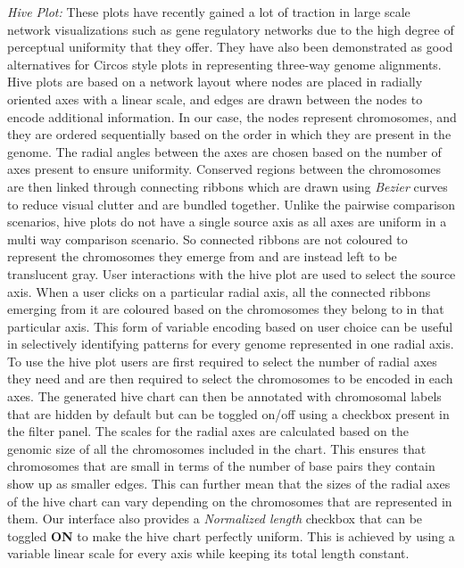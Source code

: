 \textit{Hive Plot:} These plots have recently gained a lot of traction in large scale network visualizations such as gene regulatory networks due to the high degree of perceptual uniformity that they offer\cite{krzywinski2011hive}. They have also been demonstrated as good alternatives for Circos \cite{krzywinski2009circos} style plots in representing three-way genome alignments. Hive plots are based on a network layout where nodes are placed in radially oriented axes with a linear scale, and edges are drawn between the nodes to encode additional information. In our case, the nodes represent chromosomes, and they are ordered sequentially based on the order in which they are present in the genome. The radial angles between the axes are chosen based on the number of axes present to ensure uniformity. Conserved regions between the chromosomes are then linked through connecting ribbons which are drawn using \textit{Bezier} curves to reduce visual clutter and are bundled together. Unlike the pairwise comparison scenarios, hive plots do not have a single source axis as all axes are uniform in a multi way comparison scenario. So connected ribbons are not coloured to represent the chromosomes they emerge from and are instead left to be translucent gray. User interactions with the hive plot are used to select the source axis. When a user clicks on a particular radial axis, all the connected ribbons emerging from it are coloured based on the chromosomes they belong to in that particular axis. This form of variable encoding based on user choice can be useful in selectively identifying patterns for every genome represented in one radial axis. To use the hive plot users are first required to select the number of radial axes they need and are then required to select the chromosomes to be encoded in each axes. The generated hive chart can then be annotated with chromosomal labels that are hidden by default but can be toggled on/off using a checkbox present in the filter panel. The scales for the radial axes are calculated based on the genomic size of all the chromosomes included in the chart. This ensures that chromosomes that are small in terms of the number of base pairs they contain show up as smaller edges. This can further mean that the sizes of the radial axes of the hive chart can vary depending on the chromosomes that are represented in them. Our interface also provides a \textit{Normalized length} checkbox that can be toggled \textbf{ON} to make the hive chart perfectly uniform. This is achieved by using a variable linear scale for every axis while keeping its total length constant.

